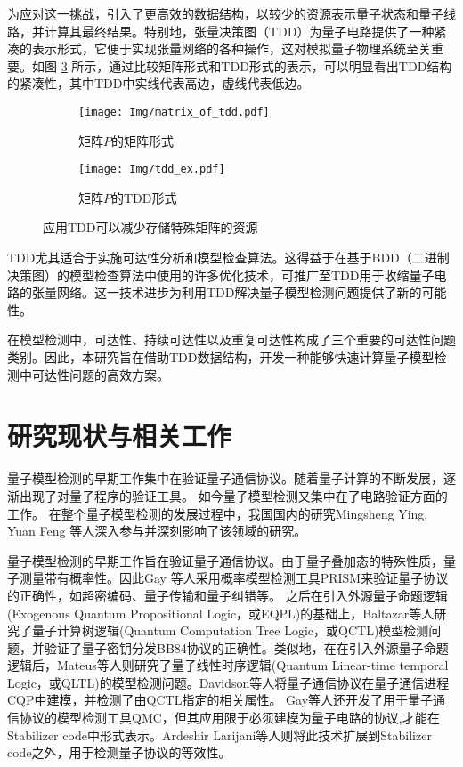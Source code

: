 为应对这一挑战，引入了更高效的数据结构，以较少的资源表示量子状态和量子线路，并计算其最终结果。特别地，张量决策图（TDD）为量子电路提供了一种紧凑的表示形式，它便于实现张量网络的各种操作，这对模拟量子物理系统至关重要。如图 \ref{fig:P} 所示，通过比较矩阵形式和TDD形式的表示，可以明显看出TDD结构的紧凑性，其中TDD中实线代表高边，虚线代表低边。
 	 
\begin{figure}[!htbp]
    \begin{subfigure}[c]{0.4\textwidth}
        \centering
        \texttt{[image: Img/matrix\_of\_tdd.pdf]}
        \caption{矩阵$P$的矩阵形式}
        \label{fig:mat_P}
    \end{subfigure}
    \begin{subfigure}[c]{0.4\textwidth}
        \centering
        \texttt{[image: Img/tdd\_ex.pdf]}
        \caption{矩阵$P$的TDD形式}
        \label{fig:tdd_P}
    \end{subfigure}
    \caption{应用TDD可以减少存储特殊矩阵的资源}
    \label{fig:P}
\end{figure}

TDD尤其适合于实施可达性分析和模型检查算法。这得益于在基于BDD（二进制决策图）的模型检查算法中使用的许多优化技术，可推广至TDD用于收缩量子电路的张量网络\citep{Chaki_2018}。这一技术进步为利用TDD解决量子模型检测问题提供了新的可能性。

在模型检测中，可达性、持续可达性以及重复可达性构成了三个重要的可达性问题类别。因此，本研究旨在借助TDD数据结构，开发一种能够快速计算量子模型检测中可达性问题的高效方案。

\section{研究现状与相关工作}
量子模型检测的早期工作集中在验证量子通信协议。随着量子计算的不断发展，逐渐出现了对量子程序的验证工具。
如今量子模型检测又集中在了电路验证方面的工作。
在整个量子模型检测的发展过程中，我国国内的研究Mingsheng Ying, Yuan Feng 等人深入参与并深刻影响了该领域的研究。

量子模型检测的早期工作旨在验证量子通信协议。由于量子叠加态的特殊性质，量子测量带有概率性。因此Gay 等人采用概率模型检测工具PRISM\citep{kwiatkowska2004probabilistic}来验证量子协议的正确性，如超密编码、量子传输和量子纠错等。
之后在引入外源量子命题逻辑(Exogenous Quantum Propositional Logic，或EQPL)\citep{mateus2006weakly}的基础上，Baltazar等人研究了量子计算树逻辑(Quantum Computation Tree Logic，或QCTL)模型检测问题，并验证了量子密钥分发BB84协议\citep{bennett2014quantum}的正确性\citep{baltazar2008quantum,baltazar2007towards}。类似地，在在引入外源量子命题逻辑后，Mateus等人则研究了量子线性时序逻辑(Quantum Linear-time temporal Logic，或QLTL)的模型检测问题\citep{mateus2009temporal}。Davidson等人将量子通信协议在量子通信进程CQP\citep{gay2005communicating}中建模，并检测了由QCTL指定的相关属性\citep{davidson2012formal,davidson2012model}。
Gay等人还开发了用于量子通信协议的模型检测工具QMC\citep{Gay,gay2010specification}，但其应用限于必须建模为量子电路的协议,才能在Stabilizer code\citep{gottesman1997stabilizer}中形式表示。Ardeshir Larijani等人则将此技术扩展到Stabilizer code之外，用于检测量子协议的等效性\citep{ardeshir2013equivalence,ardeshir2014verification}。

